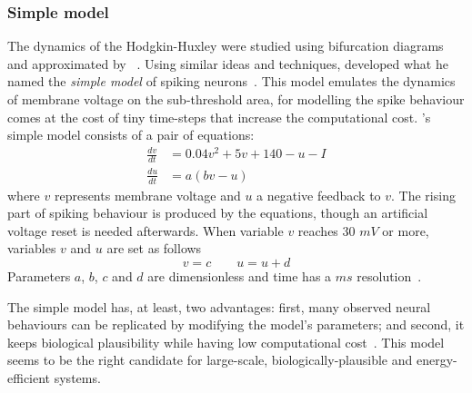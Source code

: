 \subsubsection{Simple model}
The dynamics of the Hodgkin-Huxley were studied using bifurcation diagrams and approximated by \citeauthor{fitzhugh1961impulses}~\cite{fitzhugh1961impulses}. Using similar ideas and techniques, \citeauthor{izhikevich2003simple} developed what he named the \emph{simple model} of spiking neurons~\cite{izhikevich2003simple}. This model emulates the dynamics of membrane voltage on the sub-threshold area, for modelling the spike behaviour comes at the cost of tiny time-steps that increase the computational cost. \citeauthor{izhikevich2003simple}'s simple model consists of a pair of equations:
\begin{align}
  \frac{dv}{dt} &= 0.04v^{2} + 5v + 140 - u - I \\[0.5em]
  \frac{du}{dt} &= a(bv - u)
\end{align}
where $v$ represents membrane voltage and $u$ a negative feedback to $v$. The rising part of spiking behaviour is produced by the equations, though an artificial voltage reset is needed afterwards. When variable $v$ reaches 30 $mV$ or more, variables $v$ and $u$ are set as follows
\begin{equation}
  v = c \qquad u = u + d
\end{equation}
Parameters $a$, $b$, $c$ and $d$ are dimensionless and time has a $ms$ resolution~\cite{dynamical-systems-Izhikevich2007}. 

The simple model has, at least, two advantages: first, many observed neural behaviours can be replicated by modifying the model's parameters; and second, it keeps biological plausibility while having low computational cost~\cite{izhikevich2004model}. This model seems to be the right candidate for large-scale, biologically-plausible and energy-efficient systems.












